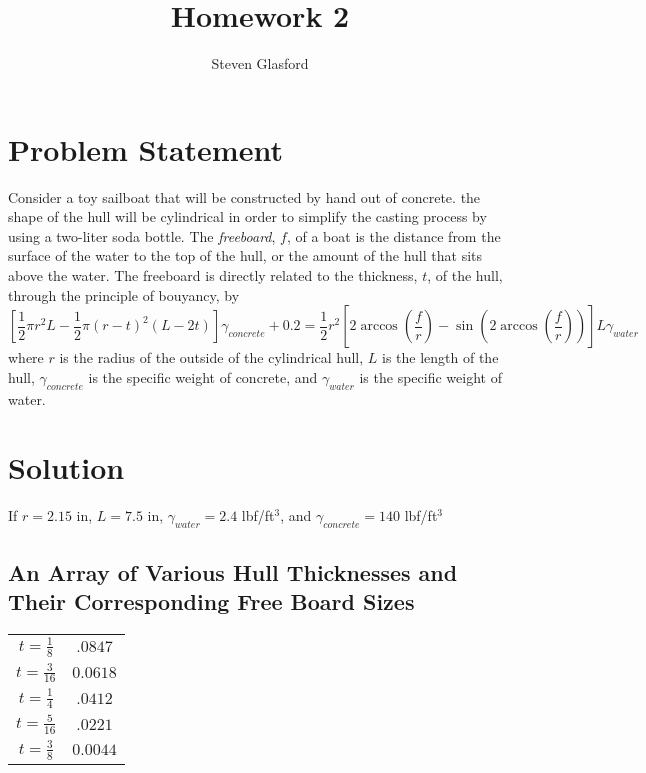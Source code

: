 \documentclass[11pt]{article}
\title{Homework 2}
\author{Steven Glasford}
\date{\parbox{\linewidth}{\centering%
    \today\endgraf\medskip
    Numerical Analysis\endgraf\medskip
    MATH-373}}
\begin{document}
\maketitle
\pagebreak

\section{Problem Statement}
Consider a toy sailboat that will be constructed by hand out of concrete. the shape of the hull will be cylindrical in order to simplify the casting process by using a two-liter soda bottle. The \emph{freeboard}, $f$, of a boat is the distance from the surface of the water to the top of the hull, or the amount of the hull that sits above the water. The freeboard is directly related to the thickness, $t$, of the hull, through the principle of bouyancy, by $$\left\lbrack\frac{1}{2}\pi r^2 L - \frac{1}{2} \pi \left(r-t\right)^2\left(L-2t\right) \right\rbrack \gamma_{concrete} +0.2 = \frac{1}{2} r^2\left\lbrack2 \arccos{\left(\frac{f}{r}\right)} - \sin{\left(2\arccos{\left(\frac{f}{r}\right)}\right)}\right\rbrack L \gamma_{water}$$
where $r$ is the radius of the outside of the cylindrical hull, $L$ is the length of the hull, $\gamma_{concrete}$ is the specific weight of concrete, and $\gamma_{water}$ is the specific weight of water. 
\section{Solution}

If $r = 2.15$ in, $L = 7.5$ in, $\gamma_{water}=2.4$ lbf/ft$^3$, and $\gamma_{concrete} = 140$ lbf/ft$^3$ 

\subsection{An Array of Various Hull Thicknesses and Their Corresponding Free Board Sizes}
\begin{center}
    \begin{tabular}{c|c}
         $t=\frac{1}{8}$&$.0847$  \\
         $t=\frac{3}{16}$&$0.0618$ \\
         $t=\frac{1}{4}$&$.0412$\\
         $t=\frac{5}{16}$&$.0221$\\
         $t=\frac{3}{8}$&$0.0044$
    \end{tabular}
\end{center}
\end{document}

